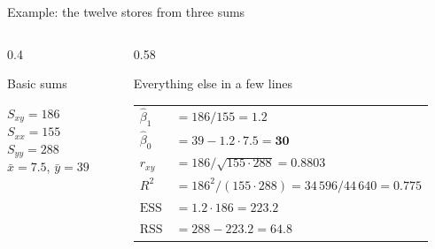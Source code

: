\documentclass[aspectratio=169,11pt]{beamer}
\begin{document}
\begin{frame}{Example: the twelve stores from three sums}
  \begin{columns}[T]
    \begin{column}{0.4\textwidth}
      \begin{block}{Basic sums}
        \begin{center}
          $S_{xy} = 186$\\[3pt]
          $S_{xx} = 155$\\[3pt]
          $S_{yy} = 288$\\[3pt]
          $\bar{x} = 7.5$, \quad $\bar{y} = 39$
        \end{center}
      \end{block}
    \end{column}
    \begin{column}{0.58\textwidth}
      \begin{exampleblock}{Everything else in a few lines}
        \renewcommand{\arraystretch}{1.35}
        \begin{tabular}{@{}l@{\;}l@{}}
          $\hat{\beta}_1$ & $= 186 / 155 = \mathbf{1.2}$ \\
          $\hat{\beta}_0$ & $= 39 - 1.2 \cdot 7.5 = \mathbf{30}$ \\
          $r_{xy}$        & $= 186 / \sqrt{155 \cdot 288} = \mathbf{0.8803}$ \\
          $R^{2}$         & $= 186^{2} / (155 \cdot 288) = 34\,596 / 44\,640 = \mathbf{0.775}$ \\
          $\text{ESS}$    & $= 1.2 \cdot 186 = \mathbf{223.2}$ \\
          $\text{RSS}$    & $= 288 - 223.2 = \mathbf{64.8}$
        \end{tabular}
      \end{exampleblock}
    \end{column}
  \end{columns}

\end{frame}
\end{document}

